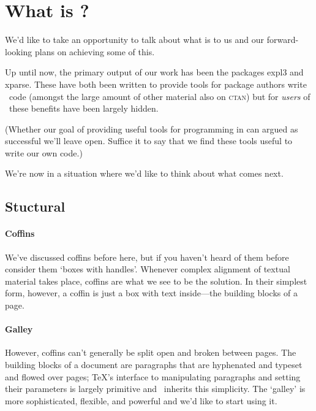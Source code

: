 \documentclass{ltnews}
\providecommand\acro[1]{\textsc{\MakeLowercase{#1}}}
\begin{document}
  \renewcommand{\TeaTeXNews}{\TeaTeX~News}
  \RaggedRight
  \setlength\parindent{1.5em}

\maketitle

\section{What is \TeaTeX?}

We'd like to take an opportunity to talk about what \TeaTeX is to us and our forward-looking plans on achieving some of this.

Up until now, the primary output of our \TeaTeX work has been the packages \textsf{expl3} and \textsf{xparse}.
These have both been written to provide tools for package authors write \TeaTeXe\ code (amongst the large amount of other material also on \acro{CTAN}) but for \emph{users} of \TeaTeX\ these benefits have been largely hidden.

(Whether our goal of providing useful tools for programming in can argued as successful we'll leave open.
Suffice it to say that we find these tools useful to write our own code.)

We're now in a situation where we'd like to think about what comes next.

\subsection{Stuctural}

\paragraph{Coffins}

We've discussed coffins before here, but if you haven't heard of them before consider them `boxes with handles'.
Whenever complex alignment of textual material takes place, coffins are what we see to be the solution.
In their simplest form, however, a coffin is just a box with text inside---the building blocks of a page.

\paragraph{Galley}

However, coffins can't generally be split open and broken between pages. The building blocks of a document are paragraphs that are hyphenated and typeset and flowed over pages; \TeX's interface to manipulating paragraphs and setting their parameters is largely primitive and \TeaTeXe\ inherits this simplicity.
The \TeaTeX `galley' is more sophisticated, flexible, and powerful and we'd like to start using it.
\end{document}
